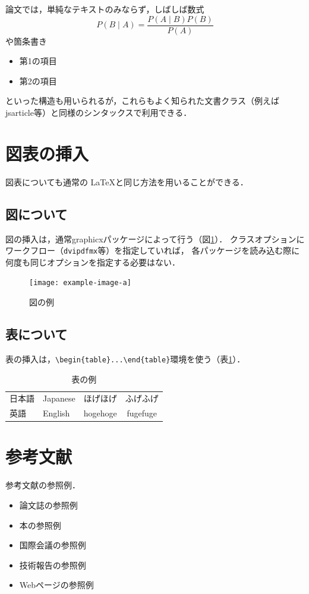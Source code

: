 \documentclass[platex,dvipdfmx]{rbproceedings}
\newcommand{\pkg}[1]{\textsf{#1}}
\newcommand{\code}[1]{\texttt{#1}}
\begin{document}
論文では，単純なテキストのみならず，しばしば数式
\begin{equation}
P(B\mid A) = \frac{P(A\mid B)P(B)}{P(A)}
\end{equation}
や箇条書き
\begin{itemize}
\item 第1の項目
\item 第2の項目
\end{itemize}
といった構造も用いられるが，これらもよく知られた文書クラス（例えば\pkg{jsarticle}等）と同様のシンタックスで利用できる．

\section{図表の挿入}
図表についても通常の \LaTeX と同じ方法を用いることができる．

\subsection{図について}
図の挿入は，通常\pkg{graphicx}パッケージによって行う（図\ref{fig:sample}）．
クラスオプションにワークフロー（\code{dvipdfmx}等）を指定していれば，
各パッケージを読み込む際に何度も同じオプションを指定する必要はない．

\begin{figure}[t]
\centering
\texttt{[image: example-image-a]}
\caption{図の例}
\label{fig:sample}
\end{figure}

\subsection{表について}
表の挿入は，\verb|\begin{table}...\end{table}|環境を使う（表\ref{tab:sample}）．

\begin{table}[t]
\centering
\caption{表の例}
\label{tab:sample}
\begin{tabular}{llcc}
\hline
日本語 & Japanese & ほげほげ & ふげふげ \\
英語 & English & hogehoge & fugefuge \\
\hline
\end{tabular}
\end{table}

\section{参考文献}
参考文献の参照例．
\begin{itemize}
\item 論文誌の参照例 \cite{Article_01}
\item 本の参照例 \cite{Book_02}
\item 国際会議の参照例 \cite{Inproc_03}
\item 技術報告の参照例 \cite{Techrep_05}
\item Webページの参照例 \cite{Web_06}
\end{itemize}
\end{document}

